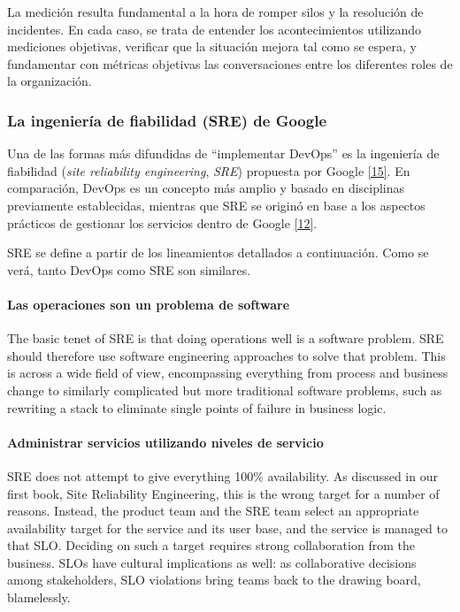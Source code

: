La medición resulta fundamental a la hora de romper silos y la resolución de incidentes. En cada caso, se trata de entender los acontecimientos utilizando mediciones objetivas, verificar que la situación mejora tal como se espera, y fundamentar con métricas objetivas las conversaciones entre los diferentes roles de la organización.

\subsubsection{La ingeniería de fiabilidad (SRE) de Google}

Una de las formas más difundidas de “implementar DevOps” es la ingeniería de fiabilidad (\textit{site reliability engineering}, \textit{SRE}) propuesta por Google \href{https://www.zotero.org/google-docs/?iZROjd}{[15]}. En comparación, DevOps es un concepto más amplio y basado en disciplinas previamente establecidas, mientras que SRE se originó en base a los aspectos prácticos de gestionar los servicios dentro de Google \href{https://www.zotero.org/google-docs/?htGmV4}{[12]}.

SRE se define a partir de los lineamientos detallados a continuación. Como se verá, tanto DevOps como SRE son similares.

\paragraph{Las operaciones son un problema de software}

The basic tenet of SRE is that doing operations well is a software problem. SRE should therefore use software engineering approaches to solve that problem. This is across a wide field of view, encompassing everything from process and business change to similarly complicated but more traditional software problems, such as rewriting a stack to eliminate single points of failure in business logic.

\paragraph{Administrar servicios utilizando niveles de servicio}

SRE does not attempt to give everything 100\% availability. As discussed in our first book, Site Reliability Engineering, this is the wrong target for a number of reasons. Instead, the product team and the SRE team select an appropriate availability target for the service and its user base, and the service is managed to that SLO. Deciding on such a target requires strong collaboration from the business. SLOs have cultural implications as well: as collaborative decisions among stakeholders, SLO violations bring teams back to the drawing board, blamelessly.

